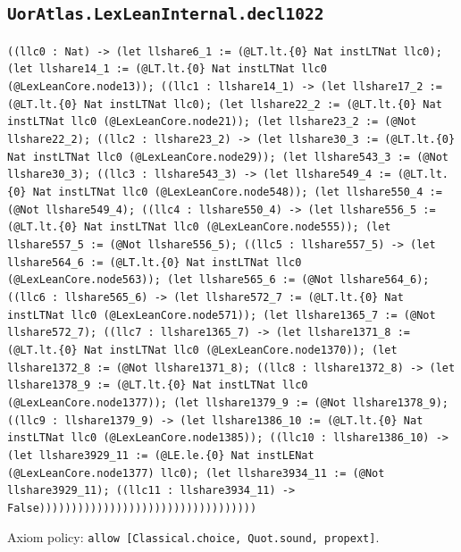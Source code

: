 \documentclass[11pt]{article}
\begin{document}
\subsection*{\texttt{UorAtlas.LexLeanInternal.decl1022}}
\noindent\texttt{((llc0 : Nat) -> (let llshare6\_1 := (@LT.lt.\{0\} Nat instLTNat llc0); (let llshare14\_1 := (@LT.lt.\{0\} Nat instLTNat llc0 (@LexLeanCore.node13)); ((llc1 : llshare14\_1) -> (let llshare17\_2 := (@LT.lt.\{0\} Nat instLTNat llc0); (let llshare22\_2 := (@LT.lt.\{0\} Nat instLTNat llc0 (@LexLeanCore.node21)); (let llshare23\_2 := (@Not llshare22\_2); ((llc2 : llshare23\_2) -> (let llshare30\_3 := (@LT.lt.\{0\} Nat instLTNat llc0 (@LexLeanCore.node29)); (let llshare543\_3 := (@Not llshare30\_3); ((llc3 : llshare543\_3) -> (let llshare549\_4 := (@LT.lt.\{0\} Nat instLTNat llc0 (@LexLeanCore.node548)); (let llshare550\_4 := (@Not llshare549\_4); ((llc4 : llshare550\_4) -> (let llshare556\_5 := (@LT.lt.\{0\} Nat instLTNat llc0 (@LexLeanCore.node555)); (let llshare557\_5 := (@Not llshare556\_5); ((llc5 : llshare557\_5) -> (let llshare564\_6 := (@LT.lt.\{0\} Nat instLTNat llc0 (@LexLeanCore.node563)); (let llshare565\_6 := (@Not llshare564\_6); ((llc6 : llshare565\_6) -> (let llshare572\_7 := (@LT.lt.\{0\} Nat instLTNat llc0 (@LexLeanCore.node571)); (let llshare1365\_7 := (@Not llshare572\_7); ((llc7 : llshare1365\_7) -> (let llshare1371\_8 := (@LT.lt.\{0\} Nat instLTNat llc0 (@LexLeanCore.node1370)); (let llshare1372\_8 := (@Not llshare1371\_8); ((llc8 : llshare1372\_8) -> (let llshare1378\_9 := (@LT.lt.\{0\} Nat instLTNat llc0 (@LexLeanCore.node1377)); (let llshare1379\_9 := (@Not llshare1378\_9); ((llc9 : llshare1379\_9) -> (let llshare1386\_10 := (@LT.lt.\{0\} Nat instLTNat llc0 (@LexLeanCore.node1385)); ((llc10 : llshare1386\_10) -> (let llshare3929\_11 := (@LE.le.\{0\} Nat instLENat (@LexLeanCore.node1377) llc0); (let llshare3934\_11 := (@Not llshare3929\_11); ((llc11 : llshare3934\_11) -> False))))))))))))))))))))))))))))))))))}\par
\noindent Axiom policy: \texttt{allow [Classical.choice, Quot.sound, propext]}.\par
\end{document}

